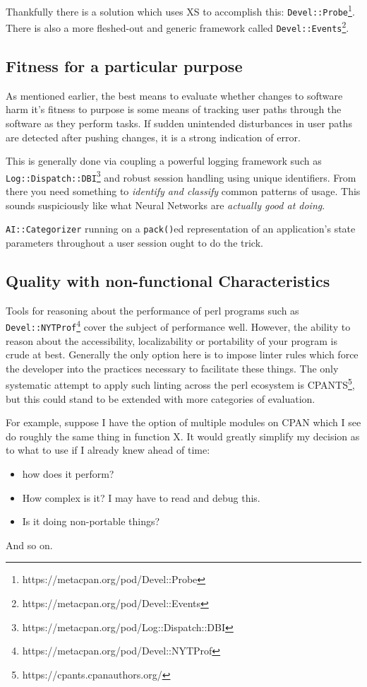 \documentclass{article}
\begin{document}
Thankfully there is a solution which uses XS to accomplish this: \texttt{Devel::Probe}\footnote{https://metacpan.org/pod/Devel::Probe}.
There is also a more fleshed-out and generic framework called \texttt{Devel::Events}\footnote{https://metacpan.org/pod/Devel::Events}.

\subsection{Fitness for a particular purpose}

As mentioned earlier, the best means to evaluate whether changes to software harm it's fitness to purpose is some means of tracking user paths through the software as they perform tasks.
If sudden unintended disturbances in user paths are detected after pushing changes, it is a strong indication of error.

This is generally done via coupling a powerful logging framework such as \texttt{Log::Dispatch::DBI}\footnote{https://metacpan.org/pod/Log::Dispatch::DBI} and robust session handling using unique identifiers.
From there you need something to \textit{identify and classify} common patterns of usage.
This sounds suspiciously like what Neural Networks are \textit{actually good at doing}.

\texttt{AI::Categorizer} running on a \texttt{pack()}ed representation of an application's state parameters throughout a user session ought to do the trick.

\subsection{Quality with non-functional Characteristics}

Tools for reasoning about the performance of perl programs such as \texttt{Devel::NYTProf}\footnote{https://metacpan.org/pod/Devel::NYTProf} cover the subject of performance well.
However, the ability to reason about the accessibility, localizability or portability of your program is crude at best.
Generally the only option here is to impose linter rules which force the developer into the practices necessary to facilitate these things.
The only systematic attempt to apply such linting across the perl ecosystem is CPANTS\footnote{https://cpants.cpanauthors.org/},
but this could stand to be extended with more categories of evaluation.

For example, suppose I have the option of multiple modules on CPAN which I see do roughly the same thing in function X.
It would greatly simplify my decision as to what to use if I already knew ahead of time:
\begin{itemize}
\item how does it perform?
\item How complex is it?  I may have to read and debug this.
\item Is it doing non-portable things?
\end{itemize}
And so on.
\end{document}
